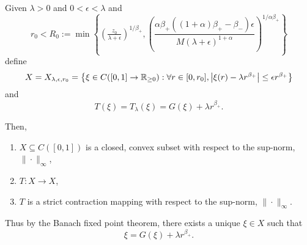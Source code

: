 \documentclass{amsart}
\begin{document}
\begin{lemma}
\label{lem:contraction}
Given \(\lambda > 0\) and \(0 < \epsilon < \lambda\) and
\begin{equation}
\label{eq:r_0}
r_0 < R_0 := \min\left\{\left(\tfrac{z_0}{\lambda + \epsilon}\right)^{1/\beta_+}, \left(\frac{\alpha\beta_+((1+\alpha)\beta_+ - \beta_-)\epsilon}{M (\lambda + \epsilon)^{1+\alpha}}\right)^{1/\alpha\beta_+}\right\}
\end{equation}
define
\begin{equation}
\label{eq:contraction_space}
X = X_{\lambda,\epsilon,r_0} = \left\{\xi \in C([0, 1] \to \mathbb{R}_{\geq 0}) : \forall r \in [0, r_0], \left|{\xi(r) - \lambda r^{\beta_+}}\right| \leq \epsilon r^{\beta_+} \right\}
\end{equation}
and
\begin{equation}
\label{eq:contraction_map}
T(\xi) = T_{\lambda} (\xi) = G(\xi) + \lambda r^{\beta_+}.
\end{equation}

Then,
\begin{enumerate}
\item \(X \subseteq C([0, 1])\) is a closed, convex subset with respect to the sup-norm, \(\|\cdot\|_{\infty}\), \label{itm:closed}
\item \(T : X \to X\), \label{itm:self_map}
\item \(T\) is a strict contraction mapping with respect to the sup-norm, \(\|\cdot\|_{\infty}\). \label{itm:contraction}
\end{enumerate}

Thus by the Banach fixed point theorem, there exists a unique \(\xi \in X\) such that
\[
\xi = G(\xi) + \lambda r^{\beta_+}.
\]
\end{lemma}
\end{document}
